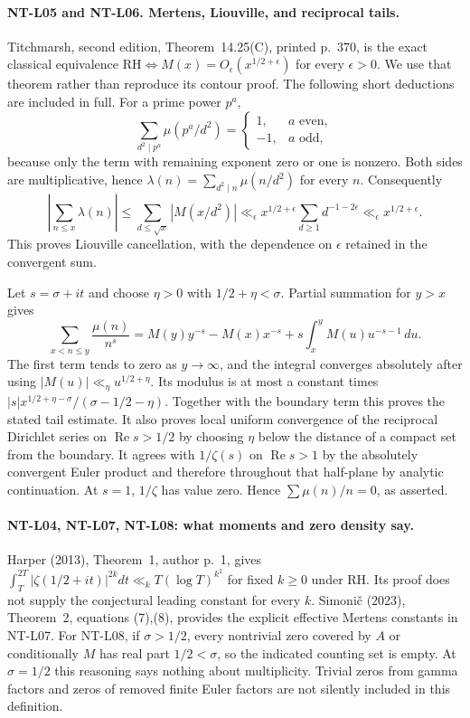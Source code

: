 \paragraph{NT-L05 and NT-L06. Mertens, Liouville, and reciprocal tails.}
Titchmarsh, second edition, Theorem~14.25(C), printed p.~370, is the exact
classical equivalence
$\mathrm{RH}\Longleftrightarrow M(x)=O_\epsilon(x^{1/2+\epsilon})$
for every $\epsilon>0$.  We use that theorem rather than reproduce its
contour proof.  The following short deductions are included in full.
For a prime power $p^a$,
\[
 \sum_{d^2\mid p^a}\mu(p^a/d^2)=
 \begin{cases}1,&a\text{ even},\\-1,&a\text{ odd},\end{cases}
\]
because only the term with remaining exponent zero or one is nonzero.
Both sides are multiplicative, hence
$\lambda(n)=\sum_{d^2\mid n}\mu(n/d^2)$ for every $n$.
Consequently
\[
 \left|\sum_{n\le x}\lambda(n)\right|
 \le\sum_{d\le\sqrt x}|M(x/d^2)|
 \ll_\epsilon x^{1/2+\epsilon}
                \sum_{d\ge1}d^{-1-2\epsilon}
 \ll_\epsilon x^{1/2+\epsilon}.
\]
This proves Liouville cancellation, with the dependence on $\epsilon$
retained in the convergent sum.

Let $s=\sigma+it$ and choose $\eta>0$ with $1/2+\eta<\sigma$.
Partial summation for $y>x$ gives
\[
 \sum_{x<n\le y}\frac{\mu(n)}{n^s}
 =M(y)y^{-s}-M(x)x^{-s}
     +s\int_x^y M(u)u^{-s-1}\,du.
\]
The first term tends to zero as $y\to\infty$, and the integral converges
absolutely after using $|M(u)|\ll_\eta u^{1/2+\eta}$.  Its modulus is at
most a constant times
$|s|x^{1/2+\eta-\sigma}/(\sigma-1/2-\eta)$.
Together with the boundary term this proves the stated tail estimate.
It also proves local uniform convergence of the reciprocal Dirichlet
series on $\operatorname{Re}s>1/2$ by choosing $\eta$ below the distance
of a compact set from the boundary.  It agrees with $1/\zeta(s)$ on
$\operatorname{Re}s>1$ by the absolutely convergent Euler product and
therefore throughout that half-plane by analytic continuation.  At
$s=1$, $1/\zeta$ has value zero.  Hence $\sum\mu(n)/n=0$, as asserted.

\paragraph{NT-L04, NT-L07, NT-L08: what moments and zero density say.}
Harper (2013), Theorem~1, author p.~1, gives
$\int_T^{2T}|\zeta(1/2+it)|^{2k}dt\ll_kT(\log T)^{k^2}$ for fixed
$k\ge0$ under RH.  Its proof does not supply the conjectural leading
constant for every $k$.  Simoni\v c (2023), Theorem~2, equations (7),(8),
provides the explicit effective Mertens constants in NT-L07.
For NT-L08, if $\sigma>1/2$, every nontrivial zero covered by $A$ or
conditionally $M$ has real part $1/2<\sigma$, so the indicated counting
set is empty.  At $\sigma=1/2$ this reasoning says nothing about
multiplicity.  Trivial zeros from gamma factors and zeros of removed
finite Euler factors are not silently included in this definition.

